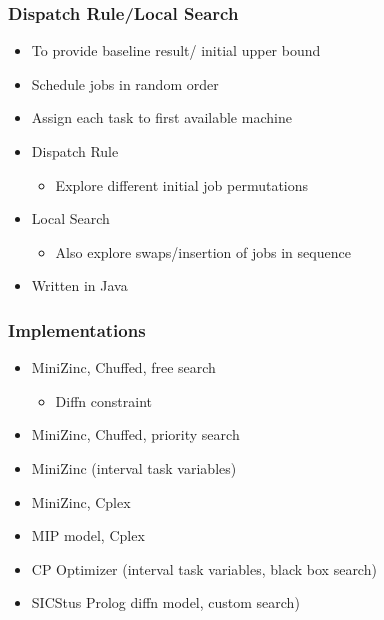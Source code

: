 \begin{frame}
\frametitle{Dispatch Rule/Local Search}
\begin{itemize}
\item To provide baseline result/ initial upper bound

\item Schedule jobs in random order

\item Assign each task to first available machine

\item Dispatch Rule
\begin{itemize}
\item Explore different initial job permutations
\end{itemize}

\item Local Search
\begin{itemize}
\item Also explore swaps/insertion of jobs in sequence
\end{itemize}

\item Written in Java
\end{itemize}
\end{frame}

\begin{frame}
\frametitle{Implementations}
\begin{itemize}
\item MiniZinc, Chuffed, free search
\begin{itemize}
\item Diffn constraint
\end{itemize}

\item MiniZinc, Chuffed, priority search

\item MiniZinc (interval task variables)

\item MiniZinc, Cplex

\item MIP model, Cplex

\item CP Optimizer (interval task variables, black box search)

\item SICStus Prolog diffn model, custom search)
\end{itemize}
\end{frame}


